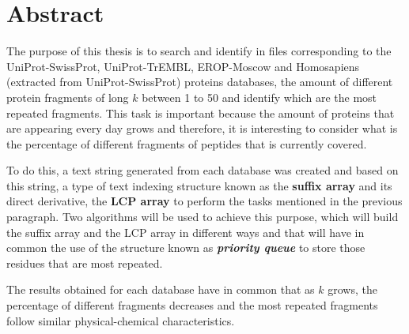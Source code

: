\chapter*{Abstract}

The purpose of this thesis is to search and identify in files corresponding to the UniProt-SwissProt, UniProt-TrEMBL, EROP-Moscow and Homosapiens (extracted from UniProt-SwissProt) proteins databases, the amount of different protein fragments of long $ k $ between 1 to 50 and identify which are the most repeated fragments. This task is important because the amount of proteins that are appearing every day grows and therefore, it is interesting to consider what is the percentage of different fragments of peptides that is currently covered.

To do this, a text string generated from each database was created and based on this string, a type of text indexing structure known as the \textbf{suffix array} and its direct derivative, the \textbf{LCP array} to perform the tasks mentioned in the previous paragraph. Two algorithms will be used to achieve this purpose, which will build the suffix array and the LCP array in different ways and that will have in common the use of the structure known as \textbf{\textit {priority queue}} to store those residues that are most repeated.

The results obtained for each database have in common that as $k$ grows, the percentage of different fragments decreases and the most repeated fragments follow similar physical-chemical characteristics.